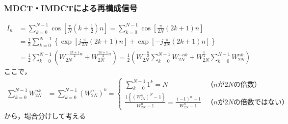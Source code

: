 \documentclass[14pt,xcolor=dvipsnames,table,dvipdfmx]{beamer}
\begin{document}
\begin{frame}[c]
    \frametitle{MDCT・IMDCTによる再構成信号}
    \scriptsize
    \begin{align*}
        I_{n} &= \sum_{k = 0}^{N - 1} \cos \left[ \frac{\pi}{N} \left( k + \frac{1}{2} \right) n \right] = \sum_{k = 0}^{N - 1} \cos \left[ \frac{\pi}{2N} ( 2k + 1 ) n \right] \\
        &= \frac{1}{2} \sum_{k = 0}^{N - 1} \left\{ \exp\left[ j \frac{\pi}{2N} ( 2k + 1 )n \right] + \exp\left[-j \frac{\pi}{2N} ( 2k + 1 )n \right] \right\} \\
        &= \frac{1}{2} \sum_{k = 0}^{N - 1} \left( W_{2N}^{-\frac{2k + 1}{2}n} + W_{2N}^{\frac{2k + 1}{2}n} \right) = \frac{1}{2} \left( W_{2N}^{-\frac{n}{2}} \sum_{k = 0}^{N - 1} W_{2N}^{-nk} + W_{2N}^{\frac{n}{2}} \sum_{k = 0}^{N - 1} W_{2N}^{nk} \right)
    \end{align*}
    ここで，
    \begin{align*}
        \sum_{k = 0}^{N - 1} W_{2N}^{nk} &= \sum_{k = 0}^{N - 1} \left( W_{2N}^{n} \right)^{k}
        = \left\{ \begin{array}{ll}
            \displaystyle \sum_{k = 0}^{N - 1} 1^{k} = N & \text{（$n$が$2N$の倍数）} \\
            \displaystyle \frac{1\left\{ \left( W_{2N}^{n} \right)^{N} - 1 \right\}}{W_{2N}^{n} - 1} = \frac{(-1)^{n} - 1}{W_{2N}^{n} - 1} & \text{（$n$が$2N$の倍数ではない）}
        \end{array} \right.
    \end{align*}
    から，場合分けして考える
\end{frame}
\end{document}
